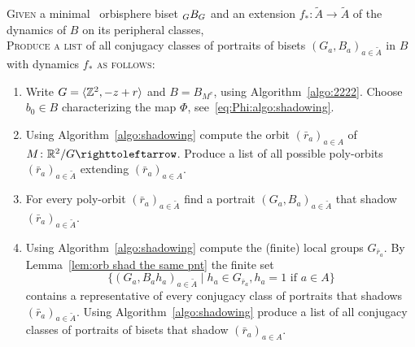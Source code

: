 \documentclass{amsart}
\newcommand\wtA{{\widetilde A}}
\begin{document}
\begin{algo}\label{algo:listportraittor}
  \textsc{Given} a minimal \Tor\ orbisphere biset $\subscript G B_G$ and an extension $f_*\colon\wtA\to\wtA$ of the dynamics of $B$ on its peripheral classes,\\
  \textsc{Produce a list} of all conjugacy classes of portraits of bisets $(G_a,B_a)_{a\in\wtA}$ in $B$ with dynamics $f_*$ \textsc{as follows:}\\\upshape
  \begin{enumerate}
  \item Write $G=\langle{\mathbb Z}^2,-z+r\rangle$ and $B=B_{M^v}$, using
    Algorithm~\ref{algo:2222}. Choose $b_0\in B$ characterizing the map $\Phi$, see~\eqref{eq:Phi:algo:shadowing}.
  \item Using Algorithm~\ref{algo:shadowing} compute the orbit $(\bar r_a)_{a\in  A}$ of $M\colon \R^2/G\selfmap$. Produce a list of all possible poly-orbits $(\bar r_a)_{a\in \wtA}$ extending $(\bar r_a)_{a\in  A}$.
  \item For every poly-orbit $(\bar r_a)_{a\in \wtA}$ find a portrait $(G_a,B_a)_{a\in \wtA}$ that shadow $(\bar r_a)_{a\in \wtA}$.
  \item Using Algorithm~\ref{algo:shadowing} compute the (finite) local groups $G_{\bar r_a}$. By Lemma~\ref{lem:orb shad the same pnt} the finite set
    \[\{(G_a,B_ah_a)_{a\in \wtA}\mid h_a\in G_{\bar r_a},
      h_a=1 \text{ if }a\in A\}
    \]
    contains a representative of every conjugacy class of portraits
    that shadows $(\bar r_a)_{a\in \wtA}$. Using
    Algorithm~\ref{algo:shadowing} produce a list of all conjugacy
    classes of portraits of bisets that shadow $(\bar r_a)_{a\in A}$.
  \end{enumerate}
\end{algo}
\end{document}
